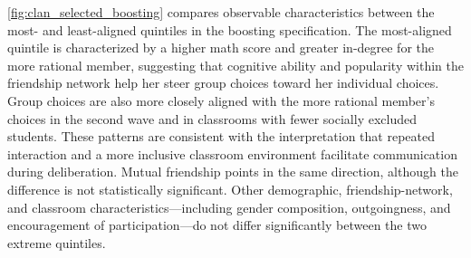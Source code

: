 \documentclass[11 pt]{article}
\begin{document}
\autoref{fig:clan_selected_boosting} compares observable characteristics between the most- and least-aligned quintiles in the boosting specification. The most-aligned quintile is characterized by a higher math score and greater in-degree for the more rational member, suggesting that cognitive ability and popularity within the friendship network help her steer group choices toward her individual choices. Group choices are also more closely aligned with the more rational member's choices in the second wave and in classrooms with fewer socially excluded students. These patterns are consistent with the interpretation that repeated interaction and a more inclusive classroom environment facilitate communication during deliberation. Mutual friendship points in the same direction, although the difference is not statistically significant. Other demographic, friendship-network, and classroom characteristics—including gender composition, outgoingness, and encouragement of participation—do not differ significantly between the two extreme quintiles.
\end{document}
